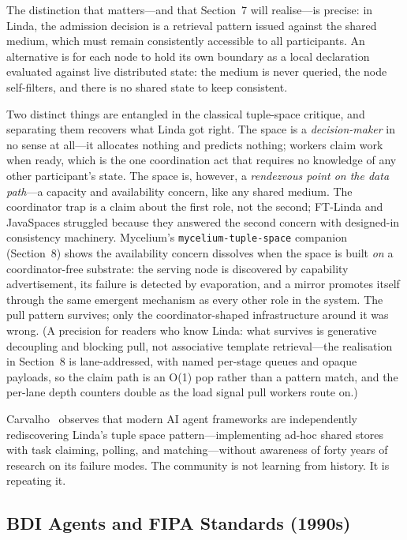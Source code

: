 \documentclass[11pt]{article}
\begin{document}
The distinction that matters---and that Section~7 will realise---is precise: in
Linda, the admission decision is a retrieval pattern issued against the shared
medium, which must remain consistently accessible to all participants. An
alternative is for each node to hold its own boundary as a local declaration
evaluated against live distributed state: the medium is never queried, the node
self-filters, and there is no shared state to keep consistent.

Two distinct things are entangled in the classical tuple-space critique, and
separating them recovers what Linda got right. The space is a
\emph{decision-maker} in no sense at all---it allocates nothing and predicts
nothing; workers claim work when ready, which is the one coordination act that
requires no knowledge of any other participant's state. The space is, however, a
\emph{rendezvous point on the data path}---a capacity and availability concern,
like any shared medium. The coordinator trap is a claim about the first role, not
the second; FT-Linda and JavaSpaces struggled because they answered the second
concern with designed-in consistency machinery. Mycelium's
\texttt{mycelium-tuple-space} companion (Section~8) shows the availability
concern dissolves when the space is built \emph{on} a coordinator-free
substrate: the serving node is discovered by capability advertisement, its
failure is detected by evaporation, and a mirror promotes itself through the same
emergent mechanism as every other role in the system. The pull pattern survives;
only the coordinator-shaped infrastructure around it was wrong. (A precision for
readers who know Linda: what survives is generative decoupling and blocking pull,
not associative template retrieval---the realisation in Section~8 is
lane-addressed, with named per-stage queues and opaque payloads, so the claim
path is an O(1) pop rather than a pattern match, and the per-lane depth counters
double as the load signal pull workers route on.)

Carvalho~\cite{carvalho} observes that modern AI agent frameworks are
independently rediscovering Linda's tuple space pattern---implementing ad-hoc
shared stores with task claiming, polling, and matching---without awareness of
forty years of research on its failure modes. The community is not learning from
history. It is repeating it.

\subsection{BDI Agents and FIPA Standards (1990s)}
\end{document}
